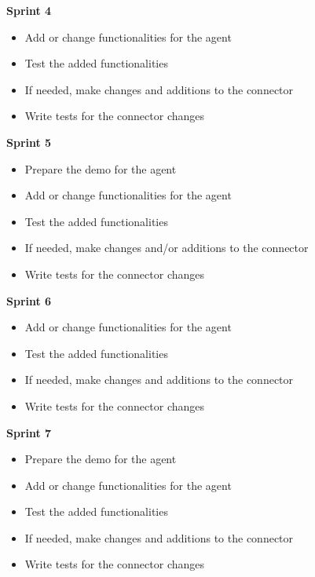 \textbf{Sprint 4}

\begin{itemize}
  \item Add or change functionalities for the agent
  \item Test the added functionalities
  \item If needed, make changes and additions to the connector
  \item Write tests for the connector changes\\
\end{itemize}

\textbf{Sprint 5}

\begin{itemize}
  \item Prepare the demo for the agent
  \item Add or change functionalities for the agent
  \item Test the added functionalities
  \item If needed, make changes and/or additions to the connector
  \item Write tests for the connector changes\\
\end{itemize}

\textbf{Sprint 6}

\begin{itemize}
  \item Add or change functionalities for the agent
  \item Test the added functionalities
  \item If needed, make changes and additions to the connector
  \item Write tests for the connector changes\\
\end{itemize}

\textbf{Sprint 7}

\begin{itemize}
  \item Prepare the demo for the agent
  \item Add or change functionalities for the agent
  \item Test the added functionalities
  \item If needed, make changes and additions to the connector
  \item Write tests for the connector changes\\
\end{itemize}

